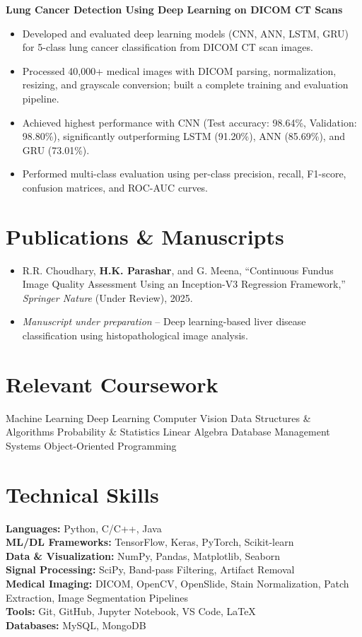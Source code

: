 \documentclass[a4paper,10pt]{article}
\begin{document}
\textbf{Lung Cancer Detection Using Deep Learning on DICOM CT Scans}
\begin{itemize}
\item Developed and evaluated deep learning models (CNN, ANN, LSTM, GRU) for 5-class lung cancer classification from DICOM CT scan images.
\item Processed 40,000+ medical images with DICOM parsing, normalization, resizing, and grayscale conversion; built a complete training and evaluation pipeline.
\item Achieved highest performance with CNN (Test accuracy: 98.64\%, Validation: 98.80\%), significantly outperforming LSTM (91.20\%), ANN (85.69\%), and GRU (73.01\%).
\item Performed multi-class evaluation using per-class precision, recall, F1-score, confusion matrices, and ROC-AUC curves.
\end{itemize}

\section{Publications \& Manuscripts}
\begin{itemize}
\item R.R. Choudhary, \textbf{H.K. Parashar}, and G. Meena, ``Continuous Fundus Image Quality Assessment Using an Inception-V3 Regression Framework,'' \textit{Springer Nature} (Under Review), 2025.
\item \textit{Manuscript under preparation} -- Deep learning-based liver disease classification using histopathological image analysis.
\end{itemize}


\section{Relevant Coursework}
Machine Learning \textbullet{} Deep Learning \textbullet{} Computer Vision \textbullet{}
Data Structures \& Algorithms \textbullet{} Probability \& Statistics \textbullet{}
Linear Algebra \textbullet{} Database Management Systems \textbullet{}
Object-Oriented Programming

\section{Technical Skills}
\textbf{Languages:} Python, C/C++, Java\\
\textbf{ML/DL Frameworks:} TensorFlow, Keras, PyTorch, Scikit-learn\\
\textbf{Data \& Visualization:} NumPy, Pandas, Matplotlib, Seaborn\\
\textbf{Signal Processing:} SciPy, Band-pass Filtering, Artifact Removal\\
\textbf{Medical Imaging:} DICOM, OpenCV, OpenSlide, Stain Normalization, Patch Extraction, Image Segmentation Pipelines\\
\textbf{Tools:} Git, GitHub, Jupyter Notebook, VS Code, LaTeX\\
\textbf{Databases:} MySQL, MongoDB
\end{document}
